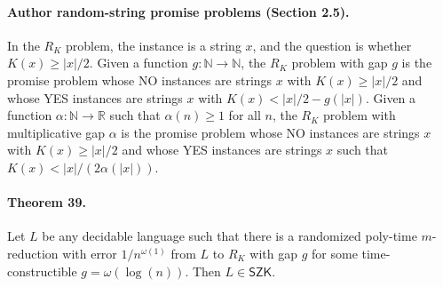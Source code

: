 \documentclass[10pt,a4paper]{article}
\begin{document}
\paragraph{Author random-string promise problems (Section 2.5).}
In the $R_K$ problem, the instance is a string $x$, and the question is whether $K(x)\geq|x|/2$. Given a function $g:\mathbb N\to\mathbb N$, the $R_K$ problem with gap $g$ is the promise problem whose NO instances are strings $x$ with $K(x)\geq|x|/2$ and whose YES instances are strings $x$ with $K(x)<|x|/2-g(|x|)$. Given a function $\alpha:\mathbb N\to\mathbb R$ such that $\alpha(n)\geq1$ for all $n$, the $R_K$ problem with multiplicative gap $\alpha$ is the promise problem whose NO instances are strings $x$ with $K(x)\geq|x|/2$ and whose YES instances are strings $x$ such that $K(x)<|x|/(2\alpha(|x|))$.

\paragraph{Theorem 39.}
Let $L$ be any decidable language such that there is a randomized poly-time $m$-reduction with error $1/n^{\omega(1)}$ from $L$ to $R_K$ with gap $g$ for some time-constructible $g=\omega(\log(n))$. Then $L\in\mathsf{SZK}$.
\end{document}
